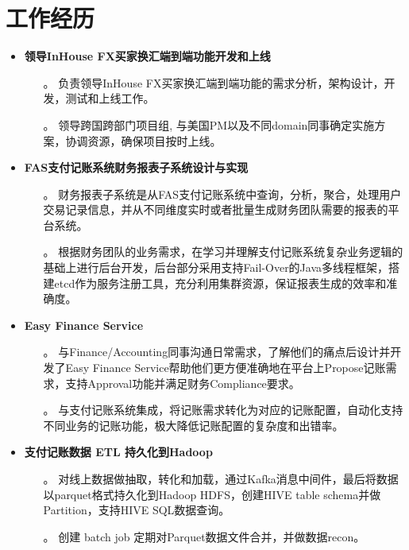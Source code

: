 \documentclass{resume}
\begin{document}
\section{工作经历}
\begin{itemize}
  \item \textbf{领导InHouse FX买家换汇端到端功能开发和上线}
  \begin{itemize}
    \item[。] 负责领导InHouse FX买家换汇端到端功能的需求分析，架构设计，开发，测试和上线工作。
    \item[。] 领导跨国跨部门项目组, 与美国PM以及不同domain同事确定实施方案，协调资源，确保项目按时上线。
  \end{itemize}
  \item \textbf{FAS支付记账系统财务报表子系统设计与实现}
  \begin{itemize}
    \item[。] 财务报表子系统是从FAS支付记账系统中查询，分析，聚合，处理用户交易记录信息，并从不同维度实时或者批量生成财务团队需要的报表的平台系统。
    \item[。] 根据财务团队的业务需求，在学习并理解支付记账系统复杂业务逻辑的基础上进行后台开发，后台部分采用支持Fail-Over的Java多线程框架，搭建etcd作为服务注册工具，充分利用集群资源，保证报表生成的效率和准确度。
  \end{itemize}
  \item \textbf{Easy Finance Service}
  \begin{itemize}
    \item[。] 与Finance/Accounting同事沟通日常需求，了解他们的痛点后设计并开发了Easy Finance Service帮助他们更方便准确地在平台上Propose记账需求，支持Approval功能并满足财务Compliance要求。
    \item[。] 与支付记账系统集成，将记账需求转化为对应的记账配置，自动化支持不同业务的记账功能，极大降低记账配置的复杂度和出错率。
  \end{itemize}
  \item \textbf{支付记账数据 ETL 持久化到Hadoop}
  \begin{itemize}
    \item[。] 对线上数据做抽取，转化和加载，通过Kafka消息中间件，最后将数据以parquet格式持久化到Hadoop HDFS，创建HIVE table schema并做Partition，支持HIVE SQL数据查询。
    \item[。] 创建 batch job 定期对Parquet数据文件合并，并做数据recon。
  \end{itemize}

\end{itemize}
\end{document}
